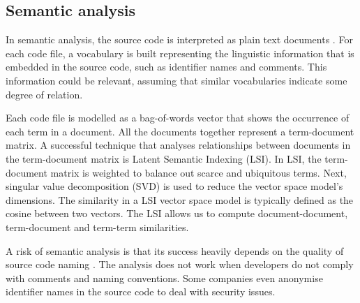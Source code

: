 \subsection{Semantic analysis}
In semantic analysis, the source code is interpreted as plain text documents \cite{beck2011congruence}. For each code file, a vocabulary is built representing the linguistic information that is embedded in the source code, such as identifier names and comments. This information could be relevant, assuming that similar vocabularies indicate some degree of relation. \par
Each code file is modelled as a bag-of-words vector that shows the occurrence of each term in a document. All the documents together represent a term-document matrix. A successful technique that analyses relationships between documents in the term-document matrix is Latent Semantic Indexing (LSI). In LSI, the term-document matrix is weighted to balance out scarce and ubiquitous terms. Next, singular value decomposition (SVD) is used to reduce the vector space model's dimensions. The similarity in a LSI vector space model is typically defined as the cosine between two vectors. The LSI allows us to compute document-document, term-document and term-term similarities. \par
A risk of semantic analysis is that its success heavily depends on the quality of source code naming \cite{saeidi2015search, alsarhan2020software}. The analysis does not work when developers do not comply with comments and naming conventions. Some companies even anonymise identifier names in the source code to deal with security issues.

